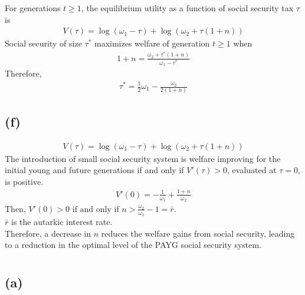 \documentclass{ltjsarticle}
\begin{document}
For generations $t \geq 1$, the equilibrium utility as a function of social security tax $\tau$ is\\
\begin{align*}
  V(\tau) = \log(\omega_1 - \tau) + \log(\omega_2 + \tau (1 + n))
\end{align*}
Social security of size $\tau^*$ maximizes welfare of generation $t \geq 1$ when\\
\begin{align*}
  1 + n = \frac{\omega_2 + \tau^* (1 + n)}{\omega_1 - \tau^*}
\end{align*}
Therefore,\\
\begin{align*}
  \tau^* = \frac{1}{2}\omega_1 - \frac{\omega_2}{2(1 + n)}
\end{align*}

\subsection*{(f)}
\begin{align*}
  V(\tau) = \log(\omega_1 - \tau) + \log(\omega_2 + \tau (1 + n))
\end{align*}
The introduction of small social security system is welfare improving for the  initial young and future generations if and only if $V\prime (\tau) > 0$, evaluated at $\tau = 0$, is positive.\\
\begin{align*}
  V\prime (0) = -\frac{1}{\omega_1} + \frac{1 + n}{\omega_2}
\end{align*}
Then, $V\prime (0) > 0 \text{ if and only if } n > \frac{\omega_2}{\omega_1} - 1 = \bar{r}$.\\
$\bar{r}$ is the autarkic interest rate.\\
Therefore, a decrease in $n$ reduces the welfare gains from social security, leading to a reduction in the optimal level of the PAYG social security system.

\section{} %

\section{} %

\subsection*{(a)}
\end{document}
